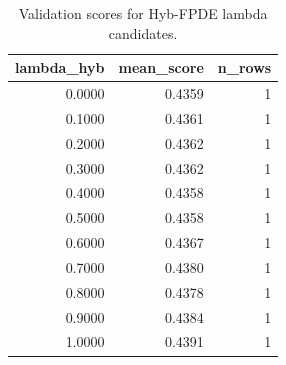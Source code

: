 \begin{table}[t]
\caption{Validation scores for Hyb-FPDE lambda candidates.}
\label{tab:lambda_distribution_computed}
\centering
\begin{tabular}{rrr}
\toprule
lambda\_hyb & mean\_score & n\_rows \\
\midrule
0.0000 & 0.4359 & 1 \\
0.1000 & 0.4361 & 1 \\
0.2000 & 0.4362 & 1 \\
0.3000 & 0.4362 & 1 \\
0.4000 & 0.4358 & 1 \\
0.5000 & 0.4358 & 1 \\
0.6000 & 0.4367 & 1 \\
0.7000 & 0.4380 & 1 \\
0.8000 & 0.4378 & 1 \\
0.9000 & 0.4384 & 1 \\
1.0000 & 0.4391 & 1 \\
\bottomrule
\end{tabular}

\end{table}
